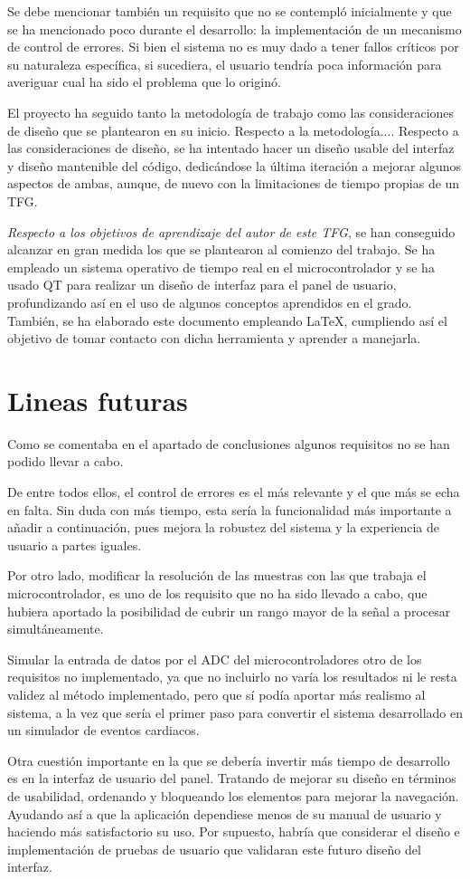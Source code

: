 Se debe mencionar también un requisito que no se contempló inicialmente y que se ha mencionado poco durante el desarrollo: la implementación de un mecanismo de control de errores. Si bien el sistema no es muy dado a tener fallos críticos por su naturaleza específica, si sucediera, el usuario tendría poca información para averiguar cual ha sido el problema que lo originó.
 
El proyecto ha seguido tanto la metodología de trabajo como las consideraciones de diseño que se plantearon en su inicio. Respecto a la metodología.... Respecto a las consideraciones de diseño, se ha intentado hacer un diseño usable del interfaz y diseño mantenible del código, dedicándose la última iteración a mejorar algunos aspectos de ambas, aunque, de nuevo con la limitaciones de tiempo propias de un TFG. 

\textit{Respecto a los objetivos de aprendizaje del autor de este TFG}, se han conseguido alcanzar en gran medida los que se plantearon al comienzo del trabajo. Se ha empleado un sistema operativo de tiempo real en el microcontrolador y se ha usado QT para realizar un diseño de interfaz para el panel de usuario, profundizando así en el uso de algunos conceptos aprendidos en el grado. También, se ha elaborado este documento empleando \LaTeX, cumpliendo así el objetivo de tomar contacto con dicha herramienta y aprender a manejarla.


\section{Lineas futuras}

Como se comentaba en el apartado de conclusiones algunos requisitos no se han podido llevar a cabo. 

De entre todos ellos, el control de errores es el más relevante y el que más se echa en falta. Sin duda con más tiempo, esta sería la funcionalidad más importante a añadir a continuación, pues mejora la robustez del sistema y la experiencia de usuario a partes iguales.

Por otro lado, modificar la resolución de las muestras con las que trabaja el microcontrolador, es uno de los requisito que no ha sido llevado a cabo, que hubiera aportado la posibilidad de cubrir un rango mayor de la señal a procesar simultáneamente.

Simular la entrada de datos por el ADC del microcontroladores otro de los requisitos no implementado,  ya que no incluirlo no varía los resultados ni le resta validez al método implementado, pero que sí podía aportar más realismo al sistema, a la vez que sería el primer paso para convertir el sistema desarrollado en un simulador de eventos cardiacos.

Otra cuestión importante en la que se debería invertir más tiempo de desarrollo es en la interfaz de usuario del panel. Tratando de mejorar su diseño en términos de usabilidad, ordenando y bloqueando los elementos para mejorar la navegación. Ayudando así a que la aplicación dependiese menos de su manual de usuario y haciendo más satisfactorio su uso. Por supuesto, habría que considerar el diseño e implementación de pruebas de usuario que validaran este futuro diseño del interfaz.

\chapterend
